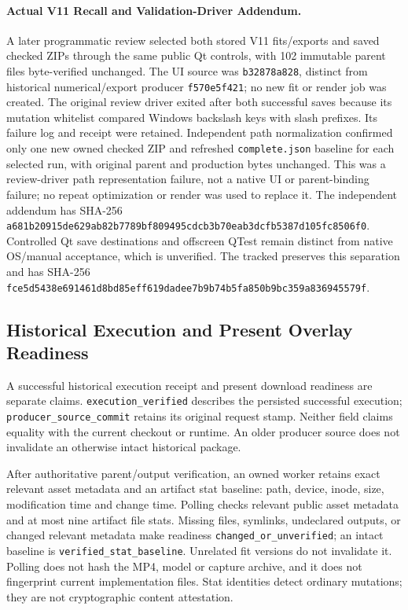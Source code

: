 \documentclass[11pt,letterpaper]{article}
\newcommand{\code}[1]{\nolinkurl{#1}}
\newcommand{\hash}[1]{{\footnotesize\nolinkurl{#1}}}
\begin{document}
\paragraph{Actual V11 Recall and Validation-Driver Addendum.}
A later programmatic review selected both stored V11 fits/exports and saved
checked ZIPs through the same public Qt controls, with 102 immutable parent
files byte-verified unchanged. The UI source was \code{b32878a828}, distinct
from historical numerical/export producer \code{f570e5f421}; no new fit or
render job was created. The original review driver exited after both successful
saves because its mutation whitelist compared Windows backslash keys with
slash prefixes. Its failure log and receipt were retained. Independent path
normalization confirmed only one new owned checked ZIP and refreshed
\code{complete.json} baseline for each selected run, with original parent and
production bytes unchanged. This was a review-driver path representation
failure, not a native UI or parent-binding failure; no repeat optimization or
render was used to replace it. The independent addendum has SHA-256
\hash{a681b20915de629ab82b7789bf809495cdcb3b70eab3dcfb5387d105fc8506f0}.
Controlled Qt save destinations and offscreen QTest remain distinct from
native OS/manual acceptance, which is unverified. The tracked
 preserves this
separation and has SHA-256
\hash{fce5d5438e691461d8bd85eff619dadee7b9b74b5fa850b9bc359a836945579f}.

\subsection{Historical Execution and Present Overlay Readiness}
A successful historical execution receipt and present download readiness are
separate claims. \code{execution_verified} describes the persisted successful
execution; \code{producer_source_commit} retains its original request stamp.
Neither field claims equality with the current checkout or runtime. An older
producer source does not invalidate an otherwise intact historical package.

After authoritative parent/output verification, an owned worker retains exact
relevant asset metadata and an artifact stat baseline: path, device, inode,
size, modification time and change time. Polling checks relevant public asset
metadata and at most nine artifact file stats. Missing files, symlinks,
undeclared outputs, or changed relevant metadata make readiness
\code{changed_or_unverified}; an intact baseline is
\code{verified_stat_baseline}. Unrelated fit versions do not invalidate it.
Polling does not hash the MP4, model or capture archive, and it does not
fingerprint current implementation files. Stat identities detect ordinary
mutations; they are not cryptographic content attestation.
\end{document}
